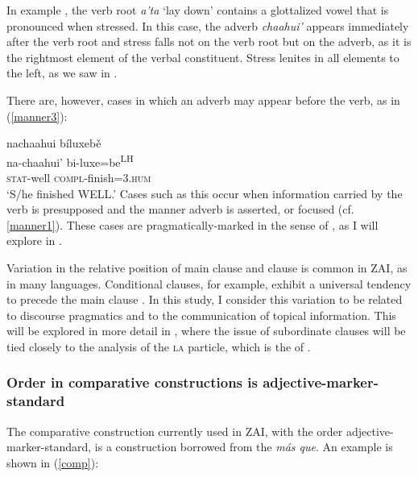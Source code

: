 \largerpage
In example , the verb root \textit{a'ta} `lay down' contains a glottalized vowel that is pronounced when stressed. In this case, the adverb \textit{chaahui'} appears immediately after the verb root and stress falls not on the verb root but on the adverb, as it is the rightmost element of the verbal constituent. Stress lenites in all elements to the left, as we saw in . 

There are, however, cases in which an adverb may appear before the verb, as in (\ref{manner3}):

\ea\label{manner3}
\glll nachaahui b\'{i}luxeb\v{e} \\
na-chaahui' bi-luxe=be\textsuperscript{LH} \\
\textsc{stat}-well \textsc{compl}-finish=\textsc{3.hum} \\
\glt `S/he finished WELL.'
\z
Cases such as this occur when information carried by the verb is presupposed and the manner adverb is asserted, or focused (cf. \ref{manner1}). These cases are pragmatically-marked in the sense of \citet{payne1995}, as I will explore in .

Variation in the relative position of main clause and  clause is common in ZAI, as in many languages. Conditional clauses, for example, exhibit a universal tendency to precede the main clause \citep{haiman1978}. In this study, I consider this variation to be related to discourse pragmatics and to the communication of topical information. This will be explored in more detail in , where the issue of subordinate  clauses will be tied closely to the analysis of the \textsc{la} particle, which is the  of .


\subsubsection{Order in comparative constructions is adjective-marker-standard}

The comparative construction currently used in ZAI, with the order adjective-marker-standard, is a construction borrowed from the  \textit{más que}. An example is shown in (\ref{comp}):

